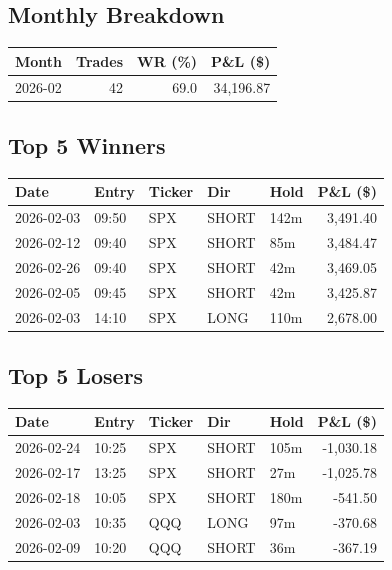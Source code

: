 \documentclass[11pt,a4paper,twoside]{article}
\begin{document}
\subsection*{Monthly Breakdown}
\noindent\begin{center}
\begin{tabular}{>{\color{txtmain}}l rrr}
\toprule
\rowcolor{cardbg}
\textbf{Month} & \textbf{Trades} & \textbf{WR (\%)} & \textbf{P\&L (\$)} \\
\midrule
2026-02 & 42 & 69.0 & \textcolor{wingreen}{34,196.87} \\
\bottomrule
\end{tabular}
\end{center}
\subsection*{Top 5 Winners}
\noindent\begin{center}
\begin{tabular}{>{\color{txtmain}}l llll r}
\toprule
\rowcolor{cardbg}
\textbf{Date} & \textbf{Entry} & \textbf{Ticker} & \textbf{Dir} & \textbf{Hold} & \textbf{P\&L (\$)} \\
\midrule
2026-02-03 & 09:50 & SPX & SHORT & 142m & \textcolor{wingreen}{3,491.40} \\
2026-02-12 & 09:40 & SPX & SHORT & 85m & \textcolor{wingreen}{3,484.47} \\
2026-02-26 & 09:40 & SPX & SHORT & 42m & \textcolor{wingreen}{3,469.05} \\
2026-02-05 & 09:45 & SPX & SHORT & 42m & \textcolor{wingreen}{3,425.87} \\
2026-02-03 & 14:10 & SPX & LONG & 110m & \textcolor{wingreen}{2,678.00} \\
\bottomrule
\end{tabular}
\end{center}
\subsection*{Top 5 Losers}
\noindent\begin{center}
\begin{tabular}{>{\color{txtmain}}l llll r}
\toprule
\rowcolor{cardbg}
\textbf{Date} & \textbf{Entry} & \textbf{Ticker} & \textbf{Dir} & \textbf{Hold} & \textbf{P\&L (\$)} \\
\midrule
2026-02-24 & 10:25 & SPX & SHORT & 105m & \textcolor{lossred}{-1,030.18} \\
2026-02-17 & 13:25 & SPX & SHORT & 27m & \textcolor{lossred}{-1,025.78} \\
2026-02-18 & 10:05 & SPX & SHORT & 180m & \textcolor{lossred}{-541.50} \\
2026-02-03 & 10:35 & QQQ & LONG & 97m & \textcolor{lossred}{-370.68} \\
2026-02-09 & 10:20 & QQQ & SHORT & 36m & \textcolor{lossred}{-367.19} \\
\bottomrule
\end{tabular}
\end{center}
\clearpage
\end{document}

